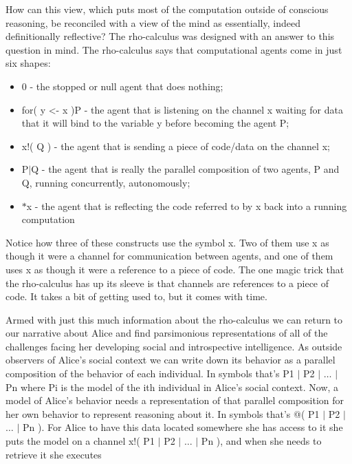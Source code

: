 \documentclass[runningheads]{llncs}
\begin{document}
\vspace{1\baselineskip}
How can this view, which puts most of the computation outside of conscious reasoning, be reconciled with a view of the mind as essentially, indeed definitionally reflective? The rho-calculus was designed with an answer to this question in mind. The rho-calculus says that computational agents come in just six shapes:

\vspace{1\baselineskip}
\begin{itemize}
	\item 0 - the stopped or null agent that does nothing;

	\item for( y <- x )P - the agent that is listening on the channel x waiting for data that it will bind to the variable y before becoming the agent P;

	\item x!( Q ) - the agent that is sending a piece of code/data on the channel x;

	\item P$\vert$Q - the agent that is really the parallel composition of two agents, P and Q, running concurrently, autonomously;

	\item $\ast$x - the agent that is reflecting the code referred to by x back into a running computation

\end{itemize}
\vspace{1\baselineskip}
Notice how three of these constructs use the symbol x. Two of them use x as though it were a channel for communication between agents, and one of them uses x as though it were a reference to a piece of code. The one magic trick that the rho-calculus has up its sleeve is that channels are references to a piece of code. It takes a bit of getting used to, but it comes with time.

\vspace{1\baselineskip}
Armed with just this much information about the rho-calculus we can return to our narrative about Alice and find parsimonious representations of all of the challenges facing her developing social and introspective intelligence. As outside observers of Alice’s social context we can write down its behavior as a parallel composition of the behavior of each individual. In symbols that’s P1 $\vert$ P2 $\vert$ $\ldots$ $\vert$ Pn where Pi is the model of the ith individual in Alice’s social context. Now, a model of Alice’s behavior needs a representation of that parallel composition for her own behavior to represent reasoning about it. In symbols that’s @( P1 $\vert$ P2 $\vert$ $\ldots$ $\vert$ Pn ). For Alice to have this data located somewhere she has access to it she puts the model on a channel x!( P1 $\vert$ P2 $\vert$ $\ldots$ $\vert$ Pn ), and when she needs to retrieve it she executes
\end{document}
